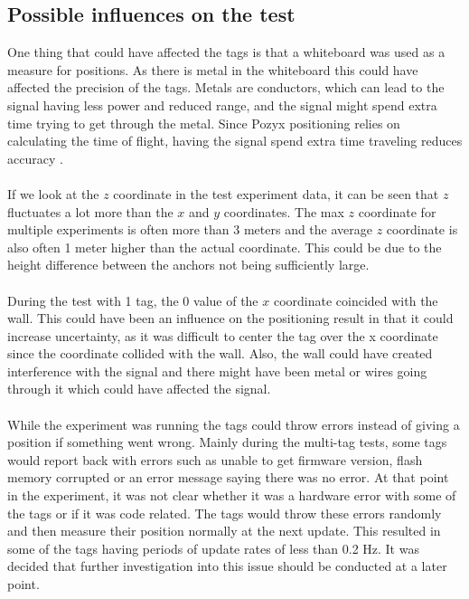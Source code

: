 \subsection{Possible influences on the test}\label{subsec:influence-on-the-test}
One thing that could have affected the tags is that a whiteboard was used as a measure for positions. 
As there is metal in the whiteboard this could have affected the precision of the tags.
Metals are conductors, which can lead to the signal having less power and reduced range, and the signal might spend extra time trying to get through the metal.
Since Pozyx positioning relies on calculating the time of flight, having the signal spend extra time traveling reduces accuracy \cite{pozyx-UWBObstacles}. 
\\\\
If we look at the $z$ coordinate in the test experiment data, it can be seen that $z$ fluctuates a lot more than the $x$ and $y$ coordinates. 
The max $z$ coordinate for multiple experiments is often more than 3 meters and the average $z$ coordinate is also often 1 meter higher than the actual coordinate.
This could be due to the height difference between the anchors not being sufficiently large.
\\\\
During the test with 1 tag, the 0 value of the $x$ coordinate coincided with the wall. 
This could have been an influence on the positioning result in that it could increase uncertainty, as it was difficult to center the tag over the x coordinate since the coordinate collided with the wall.
Also, the wall could have created interference with the signal and there might have been metal or wires going through it which could have affected the signal.
\\\\
While the experiment was running the tags could throw errors instead of giving a position if something went wrong.
Mainly during the multi-tag tests, some tags would report back with errors such as unable to get firmware version, flash memory corrupted or an error message saying there was no error.
At that point in the experiment, it was not clear whether it was a hardware error with some of the tags or if it was code related.
The tags would throw these errors randomly and then measure their position normally at the next update.
This resulted in some of the tags having periods of update rates of less than 0.2 Hz.
It was decided that further investigation into this issue should be conducted at a later point.

